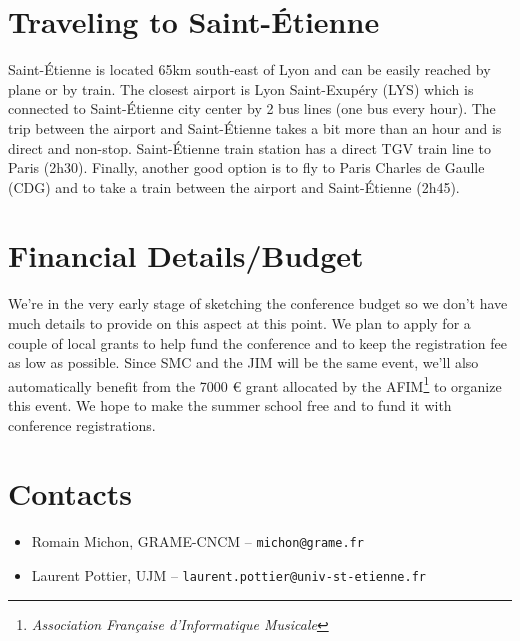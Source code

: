 \documentclass[fontsize=12pt]{scrartcl} %
\numberwithin{equation}{section} %
\numberwithin{figure}{section} %
\numberwithin{table}{section} %
\begin{document}
\section{Traveling to Saint-Étienne}

Saint-Étienne is located 65km south-east of Lyon and can be easily reached by plane or by train. The closest airport is Lyon Saint-Exupéry (LYS) which is connected to Saint-Étienne city center by 2 bus lines (one bus every hour). The trip between the airport and Saint-Étienne takes a bit more than an hour and is direct and non-stop. Saint-Étienne train station has a direct TGV train line to Paris (2h30). Finally, another good option is to fly to Paris Charles de Gaulle (CDG) and to take a train between the airport and Saint-Étienne (2h45).

\section{Financial Details/Budget}

We're in the very early stage of sketching the conference budget so we don't have much details to provide on this aspect at this point. We plan to apply for a couple of local grants to help fund the conference and to keep the registration fee as low as possible. Since SMC and the JIM will be the same event, we'll also automatically benefit from the 7000 \euro{} grant allocated by the AFIM\footnote{\textit{Association Française d'Informatique Musicale}} to organize this event. We hope to make the summer school free and to fund it with conference registrations. 

\section{Contacts}

\begin{itemize}
\item Romain Michon, GRAME-CNCM -- \texttt{michon@grame.fr}
\item Laurent Pottier, UJM -- \texttt{laurent.pottier@univ-st-etienne.fr}
\end{itemize}
\end{document}
